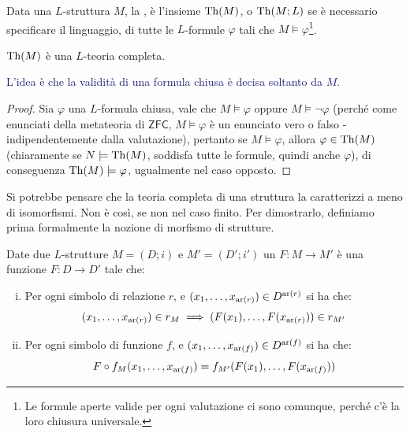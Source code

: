 \begin{definition}
    Data una $L$-struttura $M$, la , è l'insieme $\operatorname{Th}(M)$, o $\operatorname{Th}(M;L)$ se è necessario specificare il linguaggio, di tutte le $L$-formule  $\varphi$ tali che $M \models \varphi$\footnote{Le formule aperte valide per ogni valutazione ci sono comunque, perché c'è la loro chiusura universale.}.
\end{definition}

\begin{remark}
    $\operatorname{Th}(M)$ è una $L$-teoria completa.
\end{remark}

\textcolor{MidnightBlue}{L'idea è che la validità di una formula chiusa è decisa soltanto da $M$.}

\begin{proof}
    Sia $\varphi$ una $L$-formula chiusa, vale che $M \models \varphi$ oppure $M \models \neg \varphi$ (perché come enunciati della metateoria di $\mathsf{ZFC}$, $M \models \varphi$ è un enunciato vero o falso - indipendentemente dalla valutazione), pertanto se $M \models \varphi$, allora $\varphi \in \operatorname{Th}(M)$ (chiaramente se $N \models \operatorname{Th}(M)$, soddisfa tutte le formule, quindi anche $\varphi$), di conseguenza $\operatorname{Th}(M) \models \varphi$, ugualmente nel caso opposto.
\end{proof}

Si potrebbe pensare che la teoria completa di una struttura la caratterizzi a meno di isomorfismi. Non è così, se non nel caso finito.
Per dimostrarlo, definiamo prima formalmente la nozione di morfismo di strutture. 

\begin{definition}
    Date due $L$-strutture $M = (D;i)$ e $M' = (D';i')$ un  $F : M \to M'$ è una funzione $F : D \to D'$ tale che:
    \begin{enumerate}[(i)]
        \item Per ogni simbolo di relazione $r$, e $(x_1,\ldots,x_{\operatorname{ar}(r)}) \in D^{\operatorname{ar}(r)}$ si ha che:
        \[ (x_1,\ldots,x_{\operatorname{ar}(r)}) \in r_M \implies (F(x_1),\ldots,F(x_{\operatorname{ar}(r)})) \in r_{M'}
        \]
        \item Per ogni simbolo di funzione $f$, e $(x_1,\ldots,x_{\operatorname{ar}(f)}) \in D^{\operatorname{ar}(f)}$ si ha che:
        \[ F \circ f_M(x_1,\ldots,x_{\operatorname{ar}(f)}) = f_{M'}(F(x_1),\ldots,F(x_{\operatorname{ar}(f)}))
        \]
    \end{enumerate}  
\end{definition}

